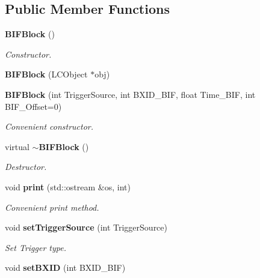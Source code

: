 \subsection*{Public Member Functions}
\begin{DoxyCompactItemize}
\item 
{\bf B\-I\-F\-Block} ()\label{classCALICE_1_1BIFBlock_a07e68d7015e5012ce8d2c6fcff0cb1ba}

\begin{DoxyCompactList}\small\item\em Constructor. \end{DoxyCompactList}\item 
{\bfseries B\-I\-F\-Block} (L\-C\-Object $\ast$obj)\label{classCALICE_1_1BIFBlock_a90292dce08c6dfe322f7491ba923faf8}

\item 
{\bf B\-I\-F\-Block} (int Trigger\-Source, int B\-X\-I\-D\-\_\-\-B\-I\-F, float Time\-\_\-\-B\-I\-F, int B\-I\-F\-\_\-\-Offset=0)\label{classCALICE_1_1BIFBlock_ab7433bcd66f140c004d4f8eefb2f9055}

\begin{DoxyCompactList}\small\item\em Convenient constructor. \end{DoxyCompactList}\item 
virtual {\bf $\sim$\-B\-I\-F\-Block} ()\label{classCALICE_1_1BIFBlock_a66d7f8a31626549b3c7b1b117cf70ae1}

\begin{DoxyCompactList}\small\item\em Destructor. \end{DoxyCompactList}\item 
void {\bf print} (std\-::ostream \&os, int)\label{classCALICE_1_1BIFBlock_a95fa0c06efa6a87da8cf1e8380072cde}

\begin{DoxyCompactList}\small\item\em Convenient print method. \end{DoxyCompactList}\item 
void {\bf set\-Trigger\-Source} (int Trigger\-Source)\label{classCALICE_1_1BIFBlock_a011c8771a288f584e02335821ecd2aa9}

\begin{DoxyCompactList}\small\item\em Set Trigger type. \end{DoxyCompactList}\item 
void {\bf set\-B\-X\-I\-D} (int B\-X\-I\-D\-\_\-\-B\-I\-F)\label{classCALICE_1_1BIFBlock_a089b2f4c9b362e0f95e8942f559bdfcd}


\end{DoxyCompactItemize}

